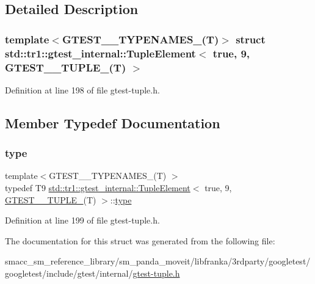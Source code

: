 \subsection{Detailed Description}
\subsubsection*{template$<$G\+T\+E\+S\+T\+\_\+\_\+\+T\+Y\+P\+E\+N\+A\+M\+E\+S\+\_\+(\+T)$>$\newline
struct std\+::tr1\+::gtest\+\_\+internal\+::\+Tuple\+Element$<$ true, 9, G\+T\+E\+S\+T\+\_\+\_\+\+T\+U\+P\+L\+E\+\_\+(\+T) $>$}



Definition at line 198 of file gtest-\/tuple.\+h.



\subsection{Member Typedef Documentation}
\mbox{\label{structstd_1_1tr1_1_1gtest__internal_1_1TupleElement_3_01true_00_019_00_01GTEST__10__TUPLE___07T_08_01_4_a4ee11fd8d3873bfa7cce21c1ed2ea770}} 
\subsubsection{\texorpdfstring{type}{type}}
{\footnotesize\ttfamily template$<$G\+T\+E\+S\+T\+\_\+\_\+\+T\+Y\+P\+E\+N\+A\+M\+E\+S\+\_\+(\+T) $>$ \\
typedef T9 \hyperlink{structstd_1_1tr1_1_1gtest__internal_1_1TupleElement}{std\+::tr1\+::gtest\+\_\+internal\+::\+Tuple\+Element}$<$ true, 9, \hyperlink{namespacestd_1_1tr1_aa636d3269bf1f368a7bc09ff158bc482}{G\+T\+E\+S\+T\+\_\+\_\+\+T\+U\+P\+L\+E\+\_\+}(T) $>$\+::\hyperlink{structstd_1_1tr1_1_1gtest__internal_1_1TupleElement_3_01true_00_019_00_01GTEST__10__TUPLE___07T_08_01_4_a4ee11fd8d3873bfa7cce21c1ed2ea770}{type}}



Definition at line 199 of file gtest-\/tuple.\+h.



The documentation for this struct was generated from the following file\+:\begin{DoxyCompactItemize}
\item 
smacc\+\_\+sm\+\_\+reference\+\_\+library/sm\+\_\+panda\+\_\+moveit/libfranka/3rdparty/googletest/googletest/include/gtest/internal/\hyperlink{gtest-tuple_8h}{gtest-\/tuple.\+h}\end{DoxyCompactItemize}
